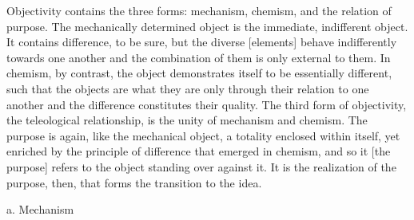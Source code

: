 Objectivity contains the three forms: mechanism, chemism, and the relation of purpose.
The mechanically determined object is the immediate, indifferent object.
It contains difference, to be sure, but the diverse [elements]
behave indifferently towards one another and the combination of them is only
external to them.
In chemism, by contrast, the object demonstrates itself to be essentially different,
such that the objects are what they are only through their
relation to one another and the difference constitutes their quality.
The third form of objectivity, the teleological relationship,
is the unity of mechanism and chemism.
The purpose is again, like the mechanical object, a totality enclosed within itself,
yet enriched by the principle of difference that emerged in chemism,
and so it [the purpose] refers to the object standing over against it.
It is the realization of the purpose, then, that forms the transition to the idea.

a. Mechanism

